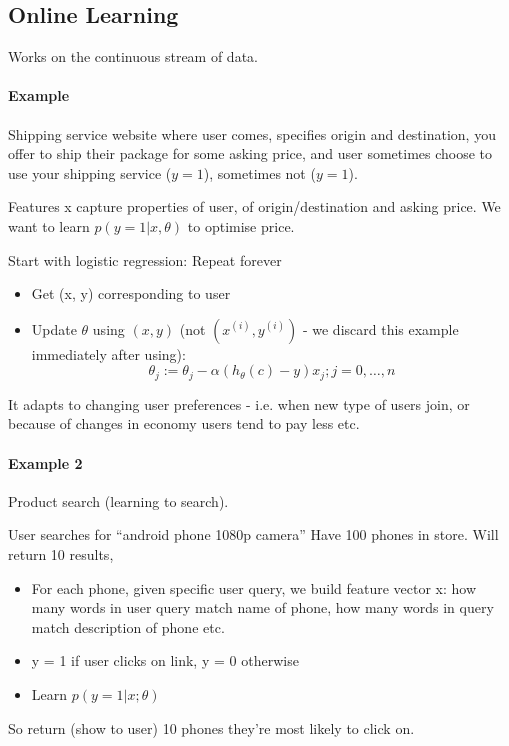 \documentclass{scrartcl}
\begin{document}
\subsection{Online Learning}
\label{sec:17-5}

Works on the continuous stream of data.

\paragraph{Example}

Shipping service website where user comes, specifies origin and
destination, you offer to ship their package for some asking price,
and user sometimes choose to use your shipping service ($y=1$),
sometimes not ($y=1$).

Features x capture properties of user, of origin/destination and
asking price. We want to learn $p(y=1|x, \theta)$ to optimise price.

Start with logistic regression: Repeat forever {
  \begin{itemize}
  \item Get (x, y) corresponding to user
  \item Update $\theta$ using $(x, y)$ (not $(x^{(i)}, y^{(i)})$ - we
    discard this example immediately after using):
    \[ \theta_j := \theta_j - \alpha (h_\theta(c) - y) x_j; j = 0,
    \dots, n \]
  \end{itemize}
}

It adapts to changing user preferences - i.e. when new type of users
join, or because of changes in economy users tend to pay less etc.

\paragraph{Example 2 }

Product search (learning to search).

User searches for ``android phone 1080p camera'' Have 100 phones in
store. Will return 10 results,
\begin{itemize}
\item For each phone, given specific user query, we build feature
  vector x: how many words in user query match name of phone, how many
  words in query match description of phone etc.
\item y = 1 if user clicks on link, y = 0 otherwise
\item Learn $p(y = 1|x;\theta)$
\end{itemize}
So return (show to user) 10 phones they're most likely to click on.
\end{document}
